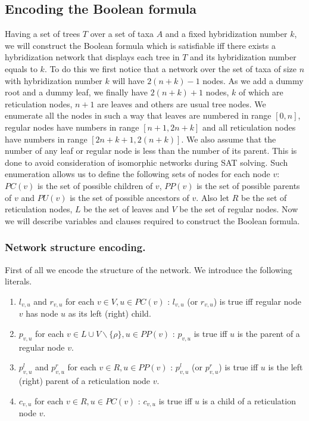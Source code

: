 \documentclass[runningheads, envcountsame, a4paper]{llncs}
\begin{document}
\subsection{Encoding the Boolean formula}

Having a set of trees $T$ over a set of taxa $A$ and a fixed hybridization number $k$, we will construct the Boolean formula 
which is satisfiable iff there exists a hybridization network that displays each tree in $T$ and its hybridization 
number equals to $k$. To do this we first notice that a network over the set of taxa of size $n$ with hybridization number 
$k$ will have $2 (n + k) - 1$ nodes. As we add a dummy root and a dummy leaf, we finally have $2 (n + k) + 1$ nodes, 
$k$ of which are reticulation nodes, $n + 1$ are leaves and others are usual tree nodes. We enumerate all the nodes in such a way 
that leaves are numbered in range $[0,n]$, regular nodes have numbers in range $[n + 1,2n + k]$ and all reticulation nodes have numbers 
in range $[2n + k + 1, 2(n + k)]$. We also assume that the number of any leaf or regular node is less than the number of its parent. This is done to 
avoid consideration of isomorphic networks during SAT solving. Such enumeration allows us to define the following sets of nodes for each node 
$v$: $PC(v)$ is the set of possible children of $v$, $PP(v)$ is the set of possible parents of $v$ and $PU(v)$ is the set of possible ancestors of $v$. Also let $R$ be the set of reticulation nodes, $L$ be the set of leaves and $V$ be the set of regular nodes. 
Now we will describe variables and clauses required to construct the Boolean formula.

\subsubsection{Network structure encoding.} 

First of all we encode the structure of the network. We introduce the following literals. 

\begin{enumerate}

\item $l_{v,u}$ and $r_{v,u}$ for each $v \in V, u \in PC(v)$ : 
$l_{v,u}$ (or $r_{v,u}$) is true iff regular node $v$ has node $u$ as its left (right) child.

\item $p_{v,u}$  for each $v \in L \cup V \backslash \{\rho\}, u \in PP(v)$ :
$p_{v,u}$ is true iff $u$ is the parent of a regular node $v$.

\item $p^l_{v,u}$ and $p^r_{v,u}$ for each $v \in R, u \in PP(v)$ :
$p^l_{v,u}$ (or $p^r_{v,u}$) is true iff $u$ is the left (right) parent of a reticulation node $v$.

\item $c_{v,u}$ for each $v \in R, u \in PC(v)$ :
$c_{v,u}$ is true iff $u$ is a child of a reticulation node $v$.

\end{enumerate}
\end{document}

